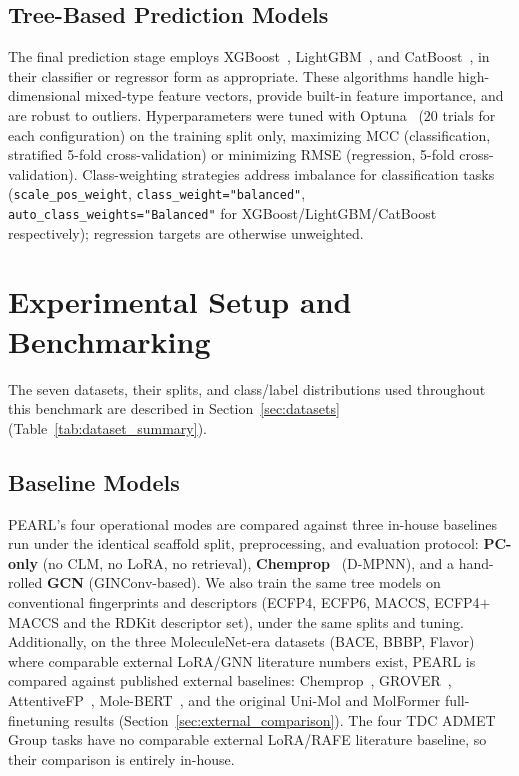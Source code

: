 \documentclass[pdflatex,sn-mathphys-num]{sn-jnl}%
\begin{document}
\subsection{Tree-Based Prediction Models}\label{sec:tree_models}
The final prediction stage employs XGBoost~\cite{chen2016xgboost}, LightGBM~\cite{ke2017lightgbm}, and CatBoost~\cite{prokhorenkova2018catboost}, in their classifier or regressor form as appropriate. These algorithms handle high-dimensional mixed-type feature vectors, provide built-in feature importance, and are robust to outliers. Hyperparameters were tuned with Optuna~\cite{akiba2019optuna} ($20$ trials for each configuration) on the training split only, maximizing MCC (classification, stratified 5-fold cross-validation) or minimizing RMSE (regression, 5-fold cross-validation). Class-weighting strategies address imbalance for classification tasks (\texttt{scale\_pos\_weight}, \texttt{class\_weight="balanced"}, \texttt{auto\_class\_weights="Balanced"} for XGBoost/LightGBM/CatBoost respectively); regression targets are otherwise unweighted.

\section{Experimental Setup and Benchmarking}\label{sec:experimental_setup}
The seven datasets, their splits, and class/label distributions used throughout this benchmark are described in Section~\ref{sec:datasets} (Table~\ref{tab:dataset_summary}).

\subsection{Baseline Models}\label{sec:baselines}
PEARL's four operational modes are compared against three in-house baselines run under the identical scaffold split, preprocessing, and evaluation protocol: \textbf{PC-only} (no CLM, no LoRA, no retrieval), \textbf{Chemprop}~\cite{yang2019chemprop} (D-MPNN), and a hand-rolled \textbf{GCN} (GINConv-based). We also train the same tree models on conventional fingerprints and descriptors (ECFP4, ECFP6, MACCS, ECFP4$+$MACCS and the RDKit descriptor set), under the same splits and tuning. Additionally, on the three MoleculeNet-era datasets (BACE, BBBP, Flavor) where comparable external LoRA/GNN literature numbers exist, PEARL is compared against published external baselines: Chemprop~\cite{yang2019chemprop}, GROVER~\cite{rong2020grover}, AttentiveFP~\cite{xiong2020attentivefp}, Mole-BERT~\cite{xia2023molecbert}, and the original Uni-Mol and MolFormer full-finetuning results (Section~\ref{sec:external_comparison}). The four TDC ADMET Group tasks have no comparable external LoRA/RAFE literature baseline, so their comparison is entirely in-house.
\end{document}
